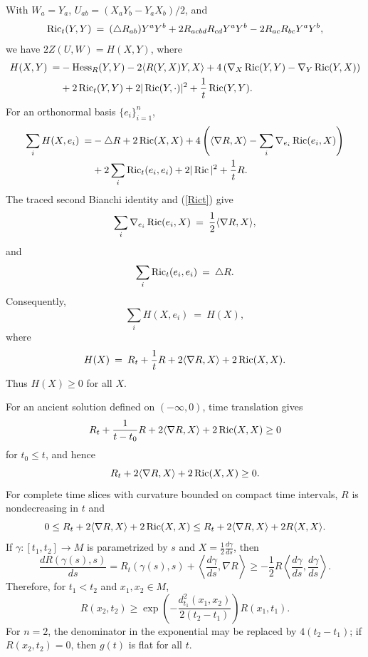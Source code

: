 With $W_a=Y_a$, $U_{ab}=(X_aY_b-Y_aX_b)/2$, and
\begin{equation} \label{Rict}
\operatorname{Ric}_t(Y,Y)\:=\:(\triangle R_{ab})Y^aY^b+2R_{acbd}R_{cd}Y^aY^b
-2R_{ac}R_{bc}Y^aY^b,
\end{equation}
we have $2Z(U,W)=H(X,Y)$, where
\begin{align} \label{Hexpression}
H(X,Y)\: = & -\operatorname{Hess}_R(Y,Y)-2\langle R(Y,X)Y,X\rangle
+4\left(\nabla_X\operatorname{Ric}(Y,Y)-\nabla_Y\operatorname{Ric}(Y,X)\right)\\
&+2\operatorname{Ric}_t(Y,Y)+2|\operatorname{Ric}(Y,\cdot)|^2+\frac1t\operatorname{Ric}(Y,Y). \notag
\end{align}
For an orthonormal basis $\{e_i\}_{i=1}^n$,
\begin{align}
\sum_iH(X,e_i)\: = & -\triangle R+2\operatorname{Ric}(X,X)
+4\left(\langle\nabla R,X\rangle-\sum_i\nabla_{e_i}\operatorname{Ric}(e_i,X)\right)\\
&+2\sum_i\operatorname{Ric}_t(e_i,e_i)+2|\operatorname{Ric}|^2+\frac1tR. \notag
\end{align}
The traced second Bianchi identity and (\ref{Rict}) give
\begin{equation}
\sum_i\nabla_{e_i}\operatorname{Ric}(e_i,X)\:=\:\frac12\langle\nabla R,X\rangle,
\end{equation}
and
\begin{equation}
\sum_i\operatorname{Ric}_t(e_i,e_i)\:=\:\triangle R.
\end{equation}
Consequently,
\begin{equation} \label{together}
\sum_iH(X,e_i)\:=\:H(X),
\end{equation}
where
\begin{equation} \label{Heqn}
H(X)\:=\:R_t+\frac1tR+2\langle\nabla R,X\rangle+2\operatorname{Ric}(X,X).
\end{equation}
Thus $H(X)\geq0$ for all $X$.

For an ancient solution defined on $(-\infty,0)$, time translation gives
\begin{equation}
R_t+\frac1{t-t_0}R+2\langle\nabla R,X\rangle+2\operatorname{Ric}(X,X)\geq0
\end{equation}
for $t_0\leq t$, and hence
\begin{equation}
R_t+2\langle\nabla R,X\rangle+2\operatorname{Ric}(X,X)\geq0.
\end{equation}
For complete time slices with curvature bounded on compact time intervals,
$R$ is nondecreasing in $t$ and
\begin{equation}
0\leq R_t+2\langle\nabla R,X\rangle+2\operatorname{Ric}(X,X)
\leq R_t+2\langle\nabla R,X\rangle+2R\langle X,X\rangle.
\end{equation}
If $\gamma:[t_1,t_2]\rightarrow M$ is parametrized by $s$ and
$X=\frac12\frac{d\gamma}{ds}$, then
\begin{equation}
\frac{dR(\gamma(s),s)}{ds}=R_t(\gamma(s),s)
+\left\langle\frac{d\gamma}{ds},\nabla R\right\rangle
\geq-\frac12R\left\langle\frac{d\gamma}{ds},\frac{d\gamma}{ds}\right\rangle.
\end{equation}
Therefore, for $t_1<t_2$ and $x_1,x_2\in M$,
\begin{equation}
\label{harnackinequality}
R(x_2,t_2)\geq
\exp\left(-\frac{d_{t_1}^2(x_1,x_2)}{2(t_2-t_1)}\right)R(x_1,t_1).
\end{equation}
For $n=2$, the denominator in the exponential may be replaced by
$4(t_2-t_1)$; if $R(x_2,t_2)=0$, then $g(t)$ is flat for all $t$.

